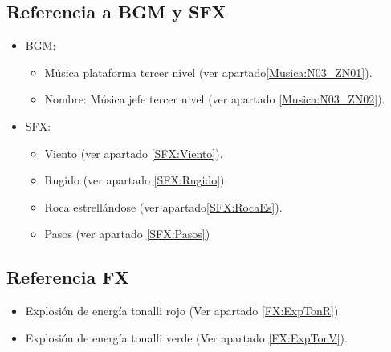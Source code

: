 	\subsection{Referencia a BGM y SFX}
\begin{itemize}
	\item BGM:
		\begin{itemize}
			\item Música plataforma tercer nivel (ver apartado\ref{Musica:N03_ZN01}).
			\item Nombre: Música jefe tercer nivel (ver apartado \ref{Musica:N03_ZN02}).
		\end{itemize}
	\item SFX:
		\begin{itemize}
			\item Viento (ver apartado \ref{SFX:Viento}).
			\item Rugido (ver apartado \ref{SFX:Rugido}).
			\item Roca estrellándose (ver apartado\ref{SFX:RocaEs}).
			\item Pasos (ver apartado \ref{SFX:Pasos})
		\end{itemize}
\end{itemize} 
	\subsection{Referencia FX}
\begin{itemize}
	\item Explosión de energía tonalli rojo (Ver apartado \ref{FX:ExpTonR}).
	\item Explosión de energía tonalli verde (Ver apartado \ref{FX:ExpTonV}).
\end{itemize}